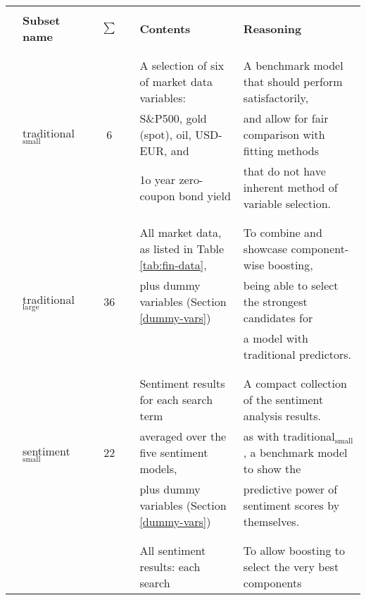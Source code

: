 \documentclass{article}
\begin{document}
\afterpage
\clearpage
\thispagestyle{empty}
\begin{landscape} \hspace{1pt}
\centering

\begin{center}
\begin{tabular}{lllclll}
 &  &  &  &  &  & \\
 & \textbf{Subset name} &  & $\sum$ &  & \textbf{Contents} & \textbf{Reasoning}\\
 &  &  &  &  &  & \\
\hline
 &  &  &  &  &  & \\
 &  &  &  &  & A selection of six of market data variables: & A benchmark model that should perform satisfactorily,\\
 & traditional$_{\text{small}}$ &  & 6 &  & S\&P500, gold (spot), oil, USD-EUR, and & and allow for fair comparison with fitting methods\\
 &  &  &  &  & 1o year zero-coupon bond yield & that do not have inherent method of variable selection.\\
 &  &  &  &  &  & \\
\hline
 &  &  &  &  &  & \\
 &  &  &  &  & All market data, as listed in Table \ref{tab:fin-data}, & To combine and showcase component-wise boosting,\\
 & traditional$_{\text{large}}$ &  & 36 &  & plus dummy variables (Section \ref{dummy-vars}) & being able to select the strongest candidates for\\
 &  &  &  &  &  & a model with traditional predictors.\\
 &  &  &  &  &  & \\
\hline
 &  &  &  &  &  & \\
 &  &  &  &  & Sentiment results for each search term & A compact collection of the sentiment analysis results.\\
 & sentiment$_{\text{small}}$ &  & 22 &  & averaged over the five sentiment models, & as with traditional$_{\text{small}}$, a benchmark model to show the\\
 &  &  &  &  & plus dummy variables (Section \ref{dummy-vars}) & predictive power of sentiment scores by themselves.\\
 &  &  &  &  &  & \\
\hline
 &  &  &  &  &  & \\
 &  &  &  &  & All sentiment results: each search & To allow boosting to select the very best components\\

\end{tabular}
\end{center}
\end{landscape}
\end{document}
